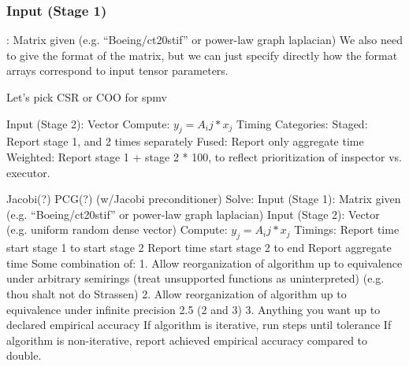 \documentclass{article}
\begin{document}
	\subsubsection{Input (Stage 1)}:
		Matrix given (e.g. “Boeing/ct20stif” or power-law graph laplacian)
		We also need to give the format of the matrix, but we can just specify directly how the format arrays correspond to input tensor parameters.

		Let’s pick CSR or COO for spmv

	Input (Stage 2):
		Vector
	Compute:
		$y_j = A_ij * x_j$
	Timing Categories:
Staged: Report stage 1, and 2 times separately
Fused: Report only aggregate time
Weighted: Report stage 1 + stage 2 * 100, to reflect prioritization of inspector vs. executor.


Jacobi(?) PCG(?) (w/Jacobi preconditioner) Solve:
	Input (Stage 1):
		Matrix given (e.g. “Boeing/ct20stif” or power-law graph laplacian)
	Input (Stage 2):
		Vector (e.g. uniform random dense vector)
	Compute:
		$y_j = A_ij * x_j$
	Timings:
Report time start stage 1 to start stage 2
Report time start stage 2 to end
Report aggregate time
Some combination of:
1. Allow reorganization of algorithm up to equivalence under arbitrary semirings (treat unsupported functions as uninterpreted) (e.g. thou shalt not do Strassen)
2. Allow reorganization of algorithm up to equivalence under infinite precision
2.5 (2 and 3)
3. Anything you want up to declared empirical accuracy
If algorithm is iterative, run steps until tolerance
If algorithm is non-iterative, report achieved empirical accuracy compared to double.
\end{document}
